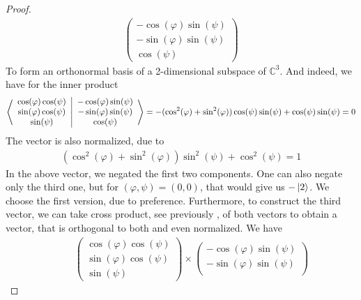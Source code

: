 \begin{proof}
    \begin{align}
        \begin{pmatrix}
            -\cos(\varphi)\sin(\psi)\\
            -\sin(\varphi)\sin(\psi)\\
            \cos(\psi)
        \end{pmatrix}
    \end{align}
    To form an orthonormal basis of a 2-dimensional subspace of \(\mathbb{C}^3\). And indeed, we have for the inner product
    \begin{align}
        \braket{\begin{array}{c}
            \cos(\varphi)\cos(\psi)\\
            \sin(\varphi)\cos(\psi)\\
            \sin(\psi)
        \end{array}}{\begin{array}{c}
            -\cos(\varphi)\sin(\psi)\\
            -\sin(\varphi)\sin(\psi)\\
            \cos(\psi)
        \end{array}} = -(\cos^2(\varphi)+\sin^2(\varphi))\cos(\psi)\sin(\psi)+\cos(\psi)\sin(\psi) = 0
    \end{align}
    The vector is also normalized, due to
    \begin{align}
        (\cos^2(\varphi)+\sin^2(\varphi))\sin^2(\psi)+\cos^2(\psi) = 1
    \end{align}
    In the above vector, we negated the first two components. One can also negate only the third one, but for \((\varphi, \psi) = (0, 0)\), that would give us \(-\ket{2}\). We choose the first version, due to preference. Furthermore, to construct the third vector, we can take cross product, see previously , of both vectors to obtain a vector, that is orthogonal to both and even normalized. We have
    \begin{align}
        &\phantom{=} \begin{pmatrix}
            \cos(\varphi)\cos(\psi)\\
            \sin(\varphi)\cos(\psi)\\
            \sin(\psi)
        \end{pmatrix}
        \times
        \begin{pmatrix}
            -\cos(\varphi)\sin(\psi)\\
            -\sin(\varphi)\sin(\psi)\\

\end{pmatrix}
\end{align}
\end{proof}
